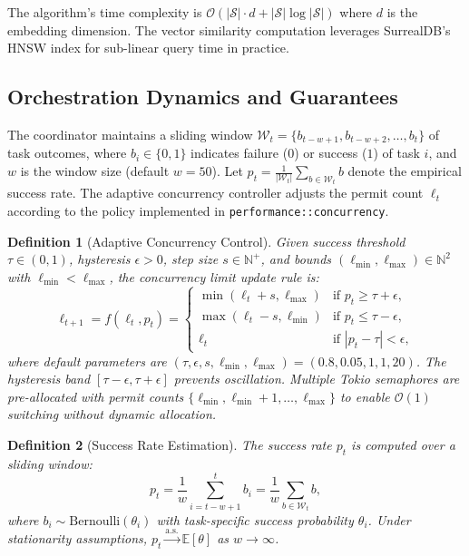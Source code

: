 \documentclass{ieeeaccess}
\newtheorem{definition}{Definition}
\begin{document}
The algorithm's time complexity is \(\mathcal{O}(|\mathcal{S}| \cdot d + |\mathcal{S}| \log |\mathcal{S}|)\) where \(d\) is the embedding dimension. The vector similarity computation leverages SurrealDB's HNSW index for sub-linear query time in practice.

\subsection{Orchestration Dynamics and Guarantees}
The coordinator maintains a sliding window \(\mathcal{W}_t = \{b_{t-w+1}, b_{t-w+2}, \ldots, b_t\}\) of task outcomes, where \(b_i \in \{0,1\}\) indicates failure (\(0\)) or success (\(1\)) of task \(i\), and \(w\) is the window size (default \(w=50\)). Let \(p_t = \frac{1}{|\mathcal{W}_t|} \sum_{b \in \mathcal{W}_t} b\) denote the empirical success rate. The adaptive concurrency controller adjusts the permit count \(\ell_t\) according to the policy implemented in \texttt{performance::concurrency}.

\begin{definition}[Adaptive Concurrency Control]
\label{def:adaptive-concurrency}
Given success threshold \(\tau \in (0,1)\), hysteresis \(\epsilon > 0\), step size \(s \in \mathbb{N}^+\), and bounds \((\ell_{\min}, \ell_{\max}) \in \mathbb{N}^2\) with \(\ell_{\min} < \ell_{\max}\), the concurrency limit update rule is:
\begin{equation}
\ell_{t+1} = f(\ell_t, p_t) =
\begin{cases}
\min(\ell_t + s, \ell_{\max}) & \text{if } p_t \geq \tau + \epsilon, \\[2pt]
\max(\ell_t - s, \ell_{\min}) & \text{if } p_t \leq \tau - \epsilon, \\[2pt]
\ell_t & \text{if } |p_t - \tau| < \epsilon,
\end{cases}
\label{eq:adaptive-concurrency}
\end{equation}
where default parameters are \((\tau, \epsilon, s, \ell_{\min}, \ell_{\max}) = (0.8, 0.05, 1, 1, 20)\). The hysteresis band \([\tau - \epsilon, \tau + \epsilon]\) prevents oscillation. Multiple Tokio semaphores are pre-allocated with permit counts \(\{\ell_{\min}, \ell_{\min}+1, \ldots, \ell_{\max}\}\) to enable \(\mathcal{O}(1)\) switching without dynamic allocation.
\end{definition}

\begin{definition}[Success Rate Estimation]
The success rate \(p_t\) is computed over a sliding window:
\begin{equation}
p_t = \frac{1}{w} \sum_{i=t-w+1}^{t} b_i = \frac{1}{w} \sum_{b \in \mathcal{W}_t} b,
\end{equation}
where \(b_i \sim \text{Bernoulli}(\theta_i)\) with task-specific success probability \(\theta_i\). Under stationarity assumptions, \(p_t \xrightarrow{\text{a.s.}} \mathbb{E}[\theta]\) as \(w \to \infty\).
\end{definition}
\end{document}
